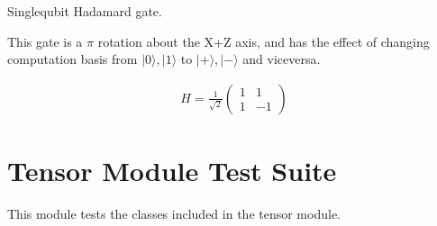\documentclass[letterpaper,10pt,english]{sphinxmanual}
\begin{document}
\begin{fulllineitems}
\label{\detokenize{index:gates.H}}
\pysigstartsignatures
{}
\pysigstopsignatures
\sphinxAtStartPar
Single\sphinxhyphen{}qubit Hadamard gate.

\sphinxAtStartPar
This gate is a \(\pi\) rotation about the X+Z axis, and has the effect of
changing computation basis from \(|0\rangle,|1\rangle\) to
\(|+\rangle,|-\rangle\) and vice\sphinxhyphen{}versa.

\sphinxAtStartPar
{}
\begin{equation*}
\begin{split}H = \frac{1}{\sqrt{2}}
    \begin{pmatrix}
        1 & 1 \\
        1 & -1
    \end{pmatrix}\end{split}
\end{equation*}
\end{fulllineitems}


\chapter{Tensor Module Test Suite}
\label{\detokenize{index:tensor-module-test-suite}}\label{\detokenize{index:module-tests.test_tensor}}
\sphinxAtStartPar
This module tests the classes included in the tensor module.
\end{document}
